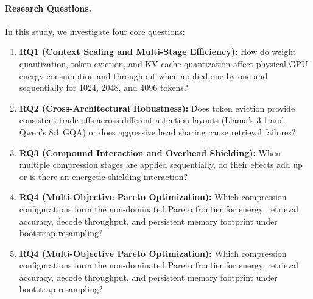 \documentclass[sigconf,nonacm]{acmart}
\begin{document}
\paragraph{Research Questions.}
In this study, we investigate four core questions:
\begin{enumerate}\raggedright
  \item \textbf{RQ1 (Context Scaling and Multi-Stage Efficiency):} How do weight quantization, token eviction, and KV-cache quantization affect physical GPU energy consumption and throughput when applied one by one and sequentially for 1024, 2048, and 4096 tokens?
  \item \textbf{RQ2 (Cross-Architectural Robustness):} Does token eviction provide consistent trade-offs across different attention layouts (Llama's 3:1 and Qwen's 8:1 GQA) or does aggressive head sharing cause retrieval failures?
  \item \textbf{RQ3 (Compound Interaction and Overhead Shielding):} When multiple compression stages are applied sequentially, do their effects add up or is there an energetic shielding interaction?
  \item \textbf{RQ4 (Multi-Objective Pareto Optimization):} Which compression configurations form the non-dominated Pareto frontier for energy, retrieval accuracy, decode throughput, and persistent memory footprint under bootstrap resampling?
  \item \textbf{RQ4 (Multi-Objective Pareto Optimization):} Which compression configurations form the non-dominated Pareto frontier for energy, retrieval accuracy, decode throughput, and persistent memory footprint under bootstrap resampling?
\end{enumerate}
\end{document}
